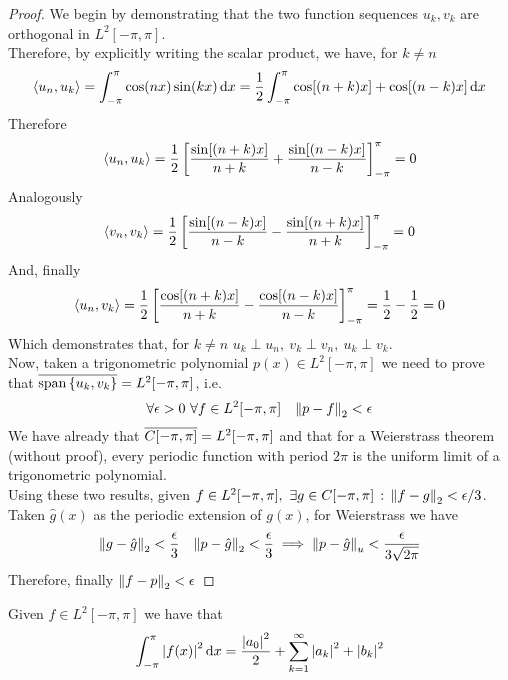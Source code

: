 \documentclass[../complete.tex]{subfiles}
\begin{document}
\begin{proof}
	We begin by demonstrating that the two function sequences $u_k,v_k$ are orthogonal in $L^2[-\pi,\pi]$.\\
	Therefore, by explicitly writing the scalar product, we have, for $k\ne n$
	\begin{equation*}
		\spr{u_n}{u_k}=\int_{-\pi}^{\pi}\cos(nx)\sin(kx)\diff x=\frac{1}{2}\int_{-\pi}^{\pi}\cos[(n+k)x]+\cos[(n-k)x]\diff x
	\end{equation*}
	Therefore
	\begin{equation*}
		\spr{u_n}{u_k}=\frac{1}{2}\left[ \frac{\sin[(n+k)x]}{n+k}+\frac{\sin[(n-k)x]}{n-k} \right]^\pi_{-\pi}=0
	\end{equation*}
	Analogously
	\begin{equation*}
		\spr{v_n}{v_k}=\frac{1}{2}\left[ \frac{\sin[(n-k)x]}{n-k}-\frac{\sin[(n+k)x]}{n+k} \right]^\pi_{-\pi}=0
	\end{equation*}
	And, finally
	\begin{equation*}
		\spr{u_n}{v_k}=\frac{1}{2}\left[ \frac{\cos[(n+k)x]}{n+k}-\frac{\cos[(n-k)x]}{n-k} \right]^{\pi}_{-\pi}=\frac{1}{2}-\frac{1}{2}=0
	\end{equation*}
	Which demonstrates that, for $k\ne n$ $u_k\perp u_n,\ v_k\perp v_n,\ u_k\perp v_k$.\\
	Now, taken a trigonometric polynomial $p(x)\in L^2[-\pi,\pi]$ we need to prove that $\cc{\span\left\{ u_k,v_k \right\}}=L^2[-\pi,\pi]$, i.e.
	\begin{equation*}
		\forall\epsilon>0\ \forall f\in L^2[-\pi,\pi]\quad\pnorm[2]{p-f}<\epsilon
	\end{equation*}
	We have already that $\cc{C[-\pi,\pi]}=L^2[-\pi,\pi]$ and that for a Weierstrass theorem (without proof), every periodic function with period $2\pi$ is the uniform limit of a trigonometric polynomial.\\
	Using these two results, given $f\in L^2[-\pi,\pi],\ \exists g\in C[-\pi,\pi]\st\pnorm[2]{f-g}<\epsilon/3$. Taken $\hat{g}(x)$ as the periodic extension of $g(x)$, for Weierstrass we have
	\begin{equation*}
		\pnorm[2]{g-\hat{g}}<\frac{\epsilon}{3}\quad\pnorm[2]{p-\hat{g}}<\frac{\epsilon}{3}\implies\unorm{p-\hat{g}}<\frac{\epsilon}{3\sqrt{2\pi}}
	\end{equation*}
	Therefore, finally $\pnorm[2]{f-p}<\epsilon$
\end{proof}
\begin{thm}
	Given $f\in L^2[-\pi,\pi]$ we have that
	\begin{equation*}
		\int_{-\pi}^{\pi}\abs{f(x)}^2\diff x=\frac{\abs{a_0}^2}{2}+\sum_{k=1}^{\infty}\abs{a_k}^2+\abs{b_k}^2
	\end{equation*}
\end{thm}
\end{document}
